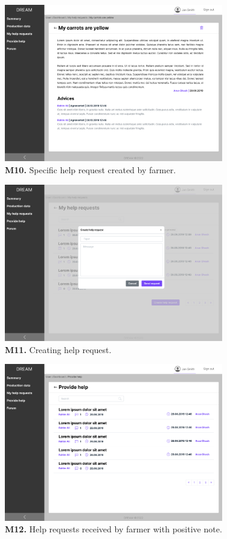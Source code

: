 \begin{figure}[H]
    \centering
    \includegraphics[width=0.85\textwidth]{mockups/Farmer_Dashboard_My help requests_VIew request.png}
    \caption{\textbf{M10.} Specific help request created by farmer.}
\end{figure}

\begin{figure}[H]
    \centering
    \includegraphics[width=0.85\textwidth]{mockups/Farmer_Dashboard_My help requests_Create help request.png}
    \caption{\textbf{M11.} Creating help request.}
\end{figure}

\begin{figure}[H]
    \centering
    \includegraphics[width=0.85\textwidth]{mockups/Farmer_Dashboard_Provide help.png}
    \caption{\textbf{M12.} Help requests received by farmer with positive note.}
\end{figure}


